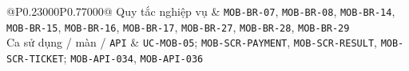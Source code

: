 \begin{longtable}{@{}P{0.23000\SRSWidth}P{0.77000\SRSWidth}@{}}
Quy tắc nghiệp vụ & \texttt{MOB-\allowbreak{}BR-\allowbreak{}07}, \texttt{MOB-\allowbreak{}BR-\allowbreak{}08}, \texttt{MOB-\allowbreak{}BR-\allowbreak{}14}, \texttt{MOB-\allowbreak{}BR-\allowbreak{}15}, \texttt{MOB-\allowbreak{}BR-\allowbreak{}16}, \texttt{MOB-\allowbreak{}BR-\allowbreak{}17}, \texttt{MOB-\allowbreak{}BR-\allowbreak{}27}, \texttt{MOB-\allowbreak{}BR-\allowbreak{}28}, \texttt{MOB-\allowbreak{}BR-\allowbreak{}29} \\[3pt]
Ca sử dụng /\allowbreak{} màn /\allowbreak{} \texttt{API} & \texttt{UC-\allowbreak{}MOB-\allowbreak{}05}; \texttt{MOB-\allowbreak{}SCR-\allowbreak{}PAYMENT}, \texttt{MOB-\allowbreak{}SCR-\allowbreak{}RESULT}, \texttt{MOB-\allowbreak{}SCR-\allowbreak{}TICKET}; \texttt{MOB-\allowbreak{}API-\allowbreak{}034}, \texttt{MOB-\allowbreak{}API-\allowbreak{}036} \\[3pt]
\end{longtable}
\endgroup

